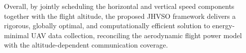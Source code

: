 Overall, by jointly scheduling the horizontal and vertical speed components together with the flight altitude, the proposed JHVSO framework delivers a rigorous, globally optimal, and computationally efficient solution to energy-minimal UAV data collection, reconciling the aerodynamic flight power model with the altitude-dependent communication coverage.













